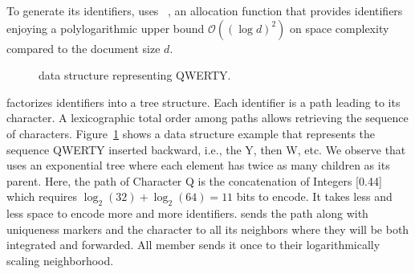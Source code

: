 To generate its identifiers, \CRATE uses \LSEQ~\cite{nedelec2013lseq}, an
allocation function that provides identifiers enjoying a polylogarithmic upper
bound $\mathcal{O}((\log d)^2)$ on space complexity compared to the document
size $d$. 

\begin{figure}
  \centering
  
  \caption{\label{fig:lseqexample}\LSEQ data structure representing QWERTY.}
\end{figure}

\LSEQ factorizes identifiers into a tree structure. Each identifier is a path
leading to its character. A lexicographic total order among paths allows
retrieving the sequence of characters. Figure~\ref{fig:lseqexample} shows a data
structure example that represents the sequence QWERTY inserted backward, i.e.,
the Y, then W, etc. We observe that \LSEQ uses an exponential tree where each
element has twice as many children as its parent. Here, the path of Character Q
is the concatenation of Integers [0.44] which requires
$\log_2(32)+\log_2(64)=11$ bits to encode. It takes less and less space to
encode more and more identifiers. \CRATE sends the path along with uniqueness
markers and the character to all its neighbors where they will be both
integrated and forwarded. All member sends it once to their logarithmically
scaling neighborhood.

